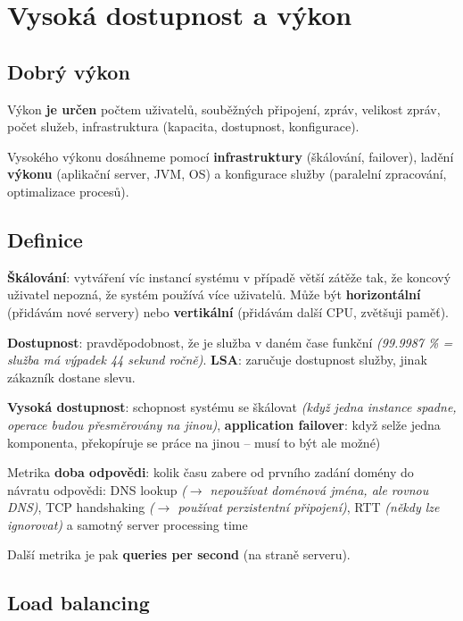 \section{Vysoká dostupnost a výkon}

\subsection{Dobrý výkon}

Výkon \textbf{je určen} počtem uživatelů, souběžných připojení, zpráv, velikost zpráv, počet služeb, infrastruktura (kapacita, dostupnost, konfigurace).

Vysokého výkonu dosáhneme pomocí \textbf{infrastruktury} (škálování, failover), ladění \textbf{výkonu} (aplikační server, JVM, OS) a konfigurace služby (paralelní zpracování, optimalizace procesů).

\subsection{Definice}

\textbf{Škálování}: vytváření víc instancí systému v případě větší zátěže tak, že koncový uživatel nepozná, že systém používá více uživatelů. Může být \textbf{horizontální} (přidávám nové servery) nebo \textbf{vertikální} (přidávám další CPU, zvětšuji paměť).

\textbf{Dostupnost}: pravděpodobnost, že je služba v daném čase funkční \textit{(99.9987 \% = služba má výpadek 44 sekund ročně)}. \textbf{LSA}: zaručuje dostupnost služby, jinak zákazník dostane slevu.

\textbf{Vysoká dostupnost}: schopnost systému se škálovat \textit{(když jedna instance spadne, operace budou přesměrovány na jinou)}, \textbf{application failover}: když selže jedna komponenta, překopíruje se práce na jinou -- musí to být ale možné)

Metrika \textbf{doba odpovědi}: kolik času zabere od prvního zadání domény do návratu odpovědi: DNS lookup \textit{($\to$ nepoužívat doménová jména, ale rovnou DNS)}, TCP handshaking \textit{($\to$ používat perzistentní připojení)}, RTT \textit{(někdy lze ignorovat)} a samotný server processing time

Další metrika je pak \textbf{queries per second} (na straně serveru).

\subsection{Load balancing}

